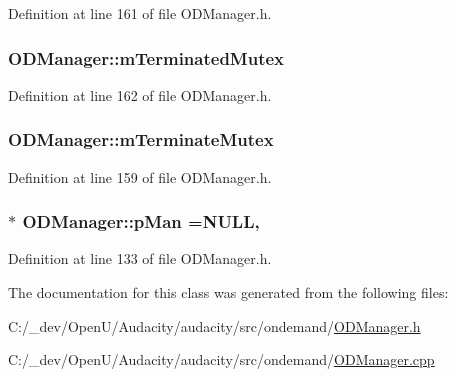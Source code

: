 Definition at line 161 of file O\+D\+Manager.\+h.

\subsubsection[{\texorpdfstring{m\+Terminated\+Mutex}{mTerminatedMutex}}]{ O\+D\+Manager\+::m\+Terminated\+Mutex\hspace{0.3cm}{\ttfamily [protected]}}\hypertarget{class_o_d_manager_ad85b08f29c24368568b063a6822eebd2}{}\label{class_o_d_manager_ad85b08f29c24368568b063a6822eebd2}


Definition at line 162 of file O\+D\+Manager.\+h.

\subsubsection[{\texorpdfstring{m\+Terminate\+Mutex}{mTerminateMutex}}]{ O\+D\+Manager\+::m\+Terminate\+Mutex\hspace{0.3cm}{\ttfamily [protected]}}\hypertarget{class_o_d_manager_a7690b70eb196abd7e7953e552735f501}{}\label{class_o_d_manager_a7690b70eb196abd7e7953e552735f501}


Definition at line 159 of file O\+D\+Manager.\+h.

\subsubsection[{\texorpdfstring{p\+Man}{pMan}}]{ $\ast$ O\+D\+Manager\+::p\+Man ={\bf N\+U\+LL}\hspace{0.3cm}{\ttfamily [static]}, {\ttfamily [protected]}}\hypertarget{class_o_d_manager_a35f30c3429c263f3d2d05206942bd036}{}\label{class_o_d_manager_a35f30c3429c263f3d2d05206942bd036}


Definition at line 133 of file O\+D\+Manager.\+h.



The documentation for this class was generated from the following files\+:\begin{DoxyCompactItemize}
\item 
C\+:/\+\_\+dev/\+Open\+U/\+Audacity/audacity/src/ondemand/\hyperlink{_o_d_manager_8h}{O\+D\+Manager.\+h}\item 
C\+:/\+\_\+dev/\+Open\+U/\+Audacity/audacity/src/ondemand/\hyperlink{_o_d_manager_8cpp}{O\+D\+Manager.\+cpp}\end{DoxyCompactItemize}
